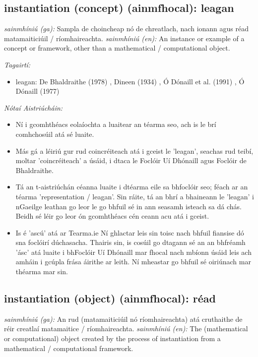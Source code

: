 \documentclass{article}
\begin{document}
\subsection*{instantiation (concept) (ainmfhocal): leagan} 
 \noindent \textit{sainmhíniú (ga):} Sampla de choincheap nó de chreatlach, nach ionann agus réad matamaiticiúil / ríomhaireachta.
\newline\newline
 \noindent \textit{sainmhíniú (en):} An instance or example of a concept or framework, other than a mathematical / computational object.
\newline

 \noindent \textit{Tagairtí:}
\begin{itemize}
	\item leagan: De Bhaldraithe (1978) \cite{de-bhaldraithe}, Dineen (1934) \cite{dineen}, Ó Dónaill et al. (1991) \cite{focloir-beag}, Ó Dónaill (1977) \cite{odonaill}
\end{itemize}

 \noindent \textit{Nótaí Aistriúcháin:}
\begin{itemize}
	\item Ní i gcomhthéacs eolaíochta a luaitear an téarma seo, ach is le brí comhchosúil atá sé luaite.
	\item Más gá a léiriú gur rud coincréiteach atá i gceist le 'leagan', seachas rud teibí, moltar 'coincréiteach' a úsáid, i dtaca le Foclóir Uí Dhónaill agus Foclóir de Bhaldraithe.
	\item Tá an t-aistriúchán céanna luaite i dtéarma eile sa bhfoclóir seo; féach ar an téarma 'representation / leagan'. Sin ráite, tá an bhrí a bhaineann le 'leagan' i nGaeilge leathan go leor le go bhfuil sé in ann seasamh isteach sa dá chás. Beidh sé léir go leor ón gcomhthéacs cén ceann acu atá i gceist.
	\item Is é 'ascú' atá ar Tearma.ie Ní ghlactar leis sin toisc nach bhfuil fiansise dó sna foclóirí dúchasacha. Thairis sin, is cosúil go dtagann sé an an bhfréamh 'ásc' atá luaite i bhFoclóir Uí Dhónaill mar fhocal nach mbíonn úsáid leis ach amháin i gcúpla frása áirithe ar leith. Ní mheastar go bhfuil sé  oiriúnach mar théarma mar sin.
\end{itemize}


\subsection*{instantiation (object) (ainmfhocal): réad} 
 \noindent \textit{sainmhíniú (ga):} An rud (matamaiticiúil nó ríomhaireachta) atá cruthaithe de réir creatlaí matamaitice / ríomhaireachta.
\newline\newline
 \noindent \textit{sainmhíniú (en):} The (mathematical or computational) object created by the process of instantiation from a mathematical / computational framework.
\newline
\end{document}
